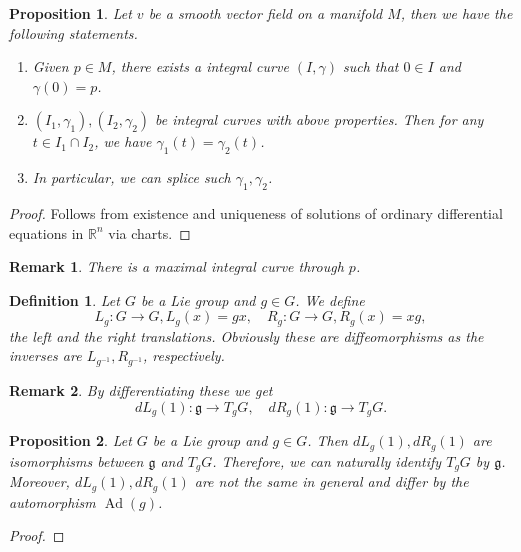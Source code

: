 \documentclass{article}
\newtheorem{proposition}{Proposition}[section]
\newtheorem{definition}{Definition}[section]
\newtheorem{remark}{Remark}[section]
\numberwithin{equation}{section}
\DeclareMathOperator{\Ad}{Ad}
\begin{document}
\begin{proposition} 
Let $v$ be a smooth vector field on a manifold $M$, then we have the following statements.
\begin{enumerate}[1).]
\item Given $p\in M$, there exists a integral curve $(I,\gamma)$ such that $0\in I$ and $\gamma(0)=p$. 
\item $(I_1,\gamma_1),(I_2,\gamma_2)$ be integral curves with above properties. Then for any $t\in I_1\cap I_2$, we have $\gamma_1(t)=\gamma_2(t)$. 
\item In particular, we can splice such $\gamma_1,\gamma_2$. 
\end{enumerate}
\label{existence_integral_curve}
\end{proposition}

\begin{proof}
Follows from existence and uniqueness of solutions of ordinary differential equations in $\mathbb{R}^n$ via charts.%
\end{proof}

\begin{remark}
There is a maximal integral curve through $p$.
\end{remark}

\begin{definition}
Let $G$ be a Lie group and $g\in G$. We define
\begin{equation*}
L_g:G\to G, L_g(x) = gx,\quad R_g:G\to G, R_g(x)=xg,
\end{equation*}
the left and the right translations. Obviously these are diffeomorphisms as the inverses are $L_{g^{-1}}, R_{g^{-1}}$, respectively.
\end{definition}

\begin{remark}
By differentiating these we get
\begin{equation*}
dL_g(1):\mathfrak{g}\to T_gG,\quad dR_g(1):\mathfrak{g}\to T_gG.
\end{equation*}
\end{remark}

\begin{proposition}
Let $G$ be a Lie group and $g\in G$. Then $dL_g(1),dR_g(1)$ are isomorphisms between $\mathfrak{g}$ and $T_gG$. Therefore, we can naturally identify $T_gG$ by $\mathfrak{g}$. Moreover, $dL_g(1),dR_g(1)$ are not the same in general and differ by the automorphism $\Ad(g)$.
\end{proposition}

\begin{proof}
\end{proof}
\end{document}
